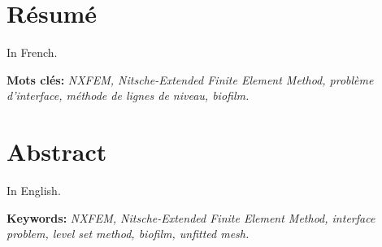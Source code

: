 \chapter*{Résumé}

In French.

\bigskip

\textbf{Mots clés:} \textit{NXFEM, Nitsche-Extended Finite Element Method, problème d’interface, méthode de lignes de niveau, biofilm.}


\chapter*{Abstract}

In English.

\bigskip

\textbf{Keywords:} \textit{NXFEM, Nitsche-Extended Finite Element Method, interface problem, level set method, biofilm, unfitted mesh.}